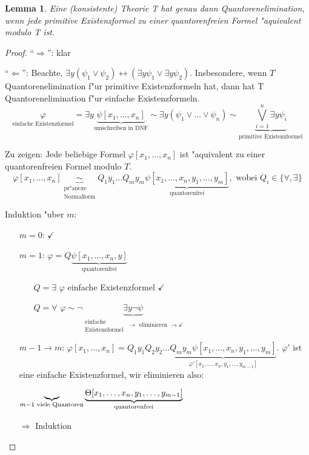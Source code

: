 \documentclass[a4paper,12pt,numbers=noenddot,parskip=full]{scrartcl}
\theoremstyle{dotless}
\newtheorem{lemma}[theorem]{Lemma}
\theoremstyle{remark}
\begin{document}
\begin{lemma}
	Eine (konsistente) Theorie T hat genau dann Quantorenelimination, wenn jede primitive Existenzformel zu einer quantorenfreien Formel "aquivalent modulo T ist.
\end{lemma}
\begin{proof}
	"`$\Rightarrow$"': klar
	
	"`$\Leftarrow$"': Beachte, $\exists y (\psi_1 \lor \psi_2) \leftrightarrow (\exists y \psi_1 \lor \exists y \psi_2)$. Insbesondere, wenn $T$ Quantorenelimination f"ur primitive Existenzformeln hat, dann hat T Quantorenelimination f"ur einfache Existenzformeln.
	\begin{equation*}
		\underset{\text{einfache Existenzformel}}{\varphi} = \exists y \underbrace{\psi[x_1, \dots, x_n]}_{\text{umschreiben in DNF}} \sim \exists y (\psi_1 \lor \dots \lor \psi_n) \sim \underbrace{\bigvee\limits^n_{i=1} \exists y \psi_i}_{\text{primitive Existenzformel}}
	\end{equation*}
	
	Zu zeigen: Jede beliebige Formel $\varphi[x_1, \dots, x_n]$ ist "aquivalent zu einer quantorenfreien Formel modulo $T$.
	\begin{equation*}
		\varphi[x_1, \dots, x_n] \underbrace{\sim}_{\substack{\text{pr"anexe}\\ \text{Normalform}}} Q_1 y_1 \dots Q_m y_m \underbrace{\psi[x_1, \dots, x_n, y_1, \dots, y_m]}_{\text{quantorenfrei}}, \text{ wobei }Q_i \in \{\forall, \exists\}
	\end{equation*}
	
	Induktion "uber $m$:
	\begin{itemize}
		\item[$m=0$:] $\checkmark$
		\item[$m=1$:] $\varphi = Q \underbrace{\psi[x_1, \dots, x_n, y]}_{\text{quantorenfrei}}$
		\begin{itemize}
			\item[$Q=\exists$] $\varphi$ einfache Existenzformel $\checkmark$
			\item[$Q=\forall$] $\varphi \sim \lnot \underbrace{\exists y \lnot \psi}_{\substack{\text{einfache}\\\text{Existenzformel }} \rightarrow \text{ eliminieren }\rightarrow \checkmark}$
		\end{itemize}
		\item[$m-1\rightarrow m$:] $\varphi[x_1, \dots, x_n]=Q_1 y_1 Q_2 y_2 \dots \underbrace{Q_m y_m \psi[x_1, \dots, x_n, y_1, \dots, y_m]}_{\varphi' [x_1, \dots, x_n, y_1, \dots, y_{m-1}]}$. $\varphi'$ ist eine einfache Existenzformel, wir eliminieren also:
		
		$\underbrace{\hfil}_{m-1 \text{ viele Quantoren}} \underbrace{\Theta[x_1, \dots, x_n, y_1, \dots, y_{m-1}]}_{\text{quantorenfrei}}$
		
		$\Rightarrow$ Induktion
	\end{itemize}

\end{proof}
\end{document}
